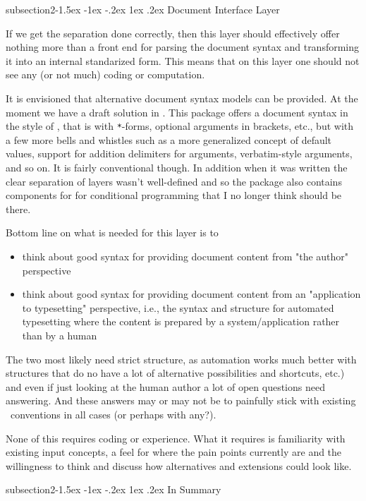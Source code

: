 \documentclass{ltnews}
\makeatletter
\newcommand{\@subheadingfont}{%
   \sffamily\slshape
   \let\LaTeX\cmssLaTeX\let\TeX\cmssTeX
}
\renewcommand{\subsection}{%
   \@startsection
      {subsection}{2}{\z@}{-1.5ex \@plus -1ex \@minus -.2ex}%
      {1ex \@plus.2ex}{\@subheadingfont}%
}
\makeatother
\begin{document}
\subsection{Document Interface Layer}

If we get the separation done correctly, then this layer should effectively offer nothing more than a front end for parsing the document syntax and transforming it into an internal standarized form. This means that on this layer one should not see any (or not much) coding or computation.

It is envisioned that alternative document syntax models can be provided.
At the moment we have a draft solution in .
This package offers a document syntax in the style of \LaTeXe, that is with \verb|*|-forms, optional arguments in brackets, etc., but with a few more bells and whistles such as a more generalized concept of default values, support for addition delimiters for arguments, verbatim-style arguments, and so on.
It is fairly conventional though.
In addition when it was written the clear separation of layers wasn't well-defined and so the package also contains components for for conditional programming that I no longer think should be there.

Bottom line on what is needed for this layer is to
\begin{itemize}
\item think about good syntax for providing document content from "the author" perspective
\item think about good syntax for providing document content from an "application to typesetting" perspective, i.e., the syntax and structure for automated typesetting where the content is prepared by a system/application rather than by a human
\end{itemize}
The two most likely need strict structure, as automation works much better with structures that do no have a lot of alternative possibilities and shortcuts, etc.) and even if just looking at the human author a lot of open questions need answering.
And these answers may or may not be to painfully stick with existing \LaTeXe\ conventions in all cases (or perhaps with any?).

None of this requires coding or  experience. What it requires is familiarity with existing input concepts, a feel for where the pain points currently are and the willingness to think and discuss how alternatives and extensions could look like.

\subsection{In Summary}
\end{document}
